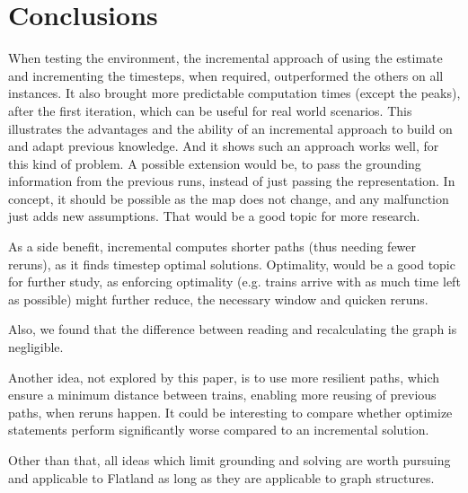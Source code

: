 \section{Conclusions}

When testing the environment, the incremental approach of using the estimate and incrementing the timesteps, when required, outperformed the others on all instances. It also brought more predictable computation times (except the peaks), after the first iteration, which can be useful for real world scenarios. This illustrates the advantages and the ability of an incremental approach to build on and adapt previous knowledge. And it shows such an approach works well, for this kind of problem. A possible extension would be, to pass the grounding information from the previous runs, instead of just passing the representation. In concept, it should be possible as the map does not change, and any malfunction just adds new assumptions. That would be a good topic for more research.

As a side benefit, incremental computes shorter paths (thus needing fewer reruns), as it finds timestep optimal solutions. Optimality, would be a good topic for further study, as enforcing optimality (e.g. trains arrive with as much time left as possible) might further reduce, the necessary window and quicken reruns.

Also, we found that the difference between reading and recalculating the graph is negligible.

Another idea, not explored by this paper, is to use more resilient paths, which ensure a minimum distance between trains, enabling more reusing of previous paths, when reruns happen. It could be interesting to compare whether optimize statements perform significantly worse compared to an incremental solution.

Other than that, all ideas which limit grounding and solving are worth pursuing and applicable to Flatland as long as they are applicable to graph structures.